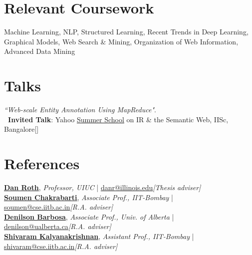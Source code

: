 \documentclass[margin,line]{templates/resume}
\newcommand{\myhref}[3][blue]{\href{#2}{\color{#1}{#3}}}
\newcommand{\compresslist}{%
\setlength{\itemsep}{3pt}%
\setlength{\parskip}{0pt}%
\setlength{\parsep}{0pt}%
}
\begin{document}
\begin{resume}
\section{\mysidestyle Relevant Coursework} 
Machine Learning, NLP, Structured Learning, Recent Trends in Deep Learning, Graphical Models, Web Search \& Mining, Organization of Web Information, Advanced Data Mining


\vspace{-0.1cm}
\section{\mysidestyle Talks}
\vspace{0mm}
\textit{``Web-scale Entity Annotation Using MapReduce"}. \\
\textbf{\ Invited Talk}: Yahoo \href{https://www.eventbrite.com/e/yahoo-summer-school-2013-registration-6688943811#}{Summer School} on IR \& the Semantic Web, IISc, Bangalore\hfill{[\myhref[darkblue]{https://shatu.github.io/talks/HadoopAnnot.ppt}{Slides}]}

\vspace{-0.2cm}    
\section{\mysidestyle References} 
\textbf{\textsf{\href{http://www.cis.upenn.edu/~danroth/}{Dan Roth}}}, \textit{Professor, UIUC} | \href{mailto:danr@illinois.edu}{danr@illinois.edu}\hfill{\textit{[Thesis adviser]}}
\vspace{0.8mm}
\\
\textbf{\textsf{\href{https://www.cse.iitb.ac.in/~soumen/}{Soumen Chakrabarti}}}, \textit{Associate Prof., IIT-Bombay} | \href{mailto:soumen@cse.iitb.ac.in}{soumen@cse.iitb.ac.in}\hfill{\textit{[R.A. adviser]}}
\vspace{0.8mm}
\\
\textbf{\textsf{\href{https://sites.ualberta.ca/~denilson/}{Denilson Barbosa}}}, \textit{Associate Prof., Univ. of Alberta} | \href{mailto:denilson@ualberta.ca}{denilson@ualberta.ca}\hfill{\textit{[R.A. adviser]}}
\vspace{0.8mm}
\\
\textbf{\textsf{\href{https://www.cse.iitb.ac.in/~shivaram/}{Shivaram Kalyanakrishnan}}}, \textit{Assistant Prof., IIT-Bombay} | \href{mailto:shivaram@cse.iitb.ac.in}{shivaram@cse.iitb.ac.in}\hfill{\textit{[R.A. adviser]}}


\end{resume}
\end{document}
